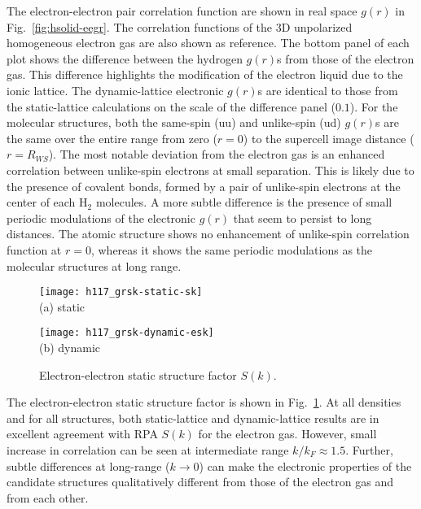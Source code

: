 The electron-electron pair correlation function are shown in real space $g(r)$ in Fig.~\ref{fig:hsolid-eegr}.
The correlation functions of the 3D unpolarized homogeneous electron gas are also shown as reference.
The bottom panel of each plot shows the difference between the hydrogen $g(r)$s from those of the electron gas.
This difference highlights the modification of the electron liquid due to the ionic lattice.
The dynamic-lattice electronic $g(r)$s are identical to those from the static-lattice calculations on the scale of the difference panel ($0.1$).
For the molecular structures, both the same-spin (uu) and unlike-spin (ud) $g(r)$s are the same over the entire range from zero ($r=0$) to the supercell image distance ($r=R_{WS}$).
The most notable deviation from the electron gas is an enhanced correlation between unlike-spin electrons at small separation.
This is likely due to the presence of covalent bonds, formed by a pair of unlike-spin electrons at the center of each H$_2$ molecules.
A more subtle difference is the presence of small periodic modulations of the electronic $g(r)$ that seem to persist to long distances.
The atomic structure shows no enhancement of unlike-spin correlation function at $r=0$, whereas it shows the same periodic modulations as the molecular structures at long range.

\begin{figure}[h]
\centering
\begin{minipage}{0.49\textwidth}
\centering
\texttt{[image: h117\_grsk-static-sk]}\\
(a) static
\end{minipage}
\begin{minipage}{0.49\textwidth}
\centering
\texttt{[image: h117\_grsk-dynamic-esk]}\\
(b) dynamic
\end{minipage}
\caption{Electron-electron static structure factor $S(k)$.}
\label{fig:hsolid-esk}
\end{figure}

The electron-electron static structure factor is shown in Fig.~\ref{fig:hsolid-esk}.
At all densities and for all structures, both static-lattice and dynamic-lattice results are in excellent agreement with RPA $S(k)$ for the electron gas.
However, small increase in correlation can be seen at intermediate range $k/k_F\approx 1.5$.
Further, subtle differences at long-range ($k\rightarrow0$) can make the electronic properties of the candidate structures qualitatively different from those of the electron gas and from each other.

